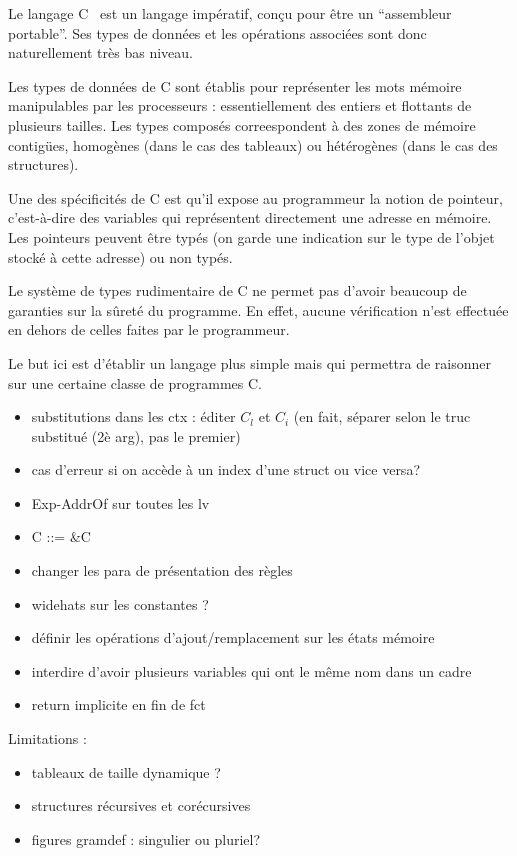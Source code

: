 
Le langage C~\cite{KandR} est un langage impératif, conçu pour être un
``assembleur portable''. Ses types de données et les opérations associées sont
donc naturellement très bas niveau.

Les types de données de C sont établis pour représenter les mots mémoire
manipulables par les processeurs : essentiellement des entiers et flottants de
plusieurs tailles. Les types composés correespondent à des zones de mémoire
contigües, homogènes (dans le cas des tableaux) ou hétérogènes (dans le cas des
structures).

Une des spécificités de C est qu'il expose au programmeur la notion de pointeur,
c'est-à-dire des variables qui représentent directement une adresse en mémoire.
Les pointeurs peuvent être typés (on garde une indication sur le type de l'objet
stocké à cette adresse) ou non typés.

Le système de types rudimentaire de C ne permet pas d'avoir beaucoup de
garanties sur la sûreté du programme. En effet, aucune vérification n'est
effectuée en dehors de celles faites par le programmeur.

Le but ici est d'établir un langage plus simple mais qui permettra de raisonner
sur une certaine classe de programmes C.


\begin{itemize}
\item substitutions dans les ctx : éditer $C_l$ et $C_i$
  (en fait, séparer selon le truc substitué (2è arg), pas le premier)
\item cas d'erreur si on accède à un index d'une struct ou vice versa?
\item Exp-AddrOf sur toutes les lv
\item C ::= \&C
\item changer les para de présentation des règles
\item widehats sur les constantes ?
\item définir les opérations d'ajout/remplacement sur les états mémoire
\item interdire d'avoir plusieurs variables qui ont le même nom dans un cadre
\item return implicite en fin de fct
\end{itemize}

Limitations :

\begin{itemize}
\item tableaux de taille dynamique ?
\item structures récursives et corécursives
\item figures gramdef : singulier ou pluriel?
\end{itemize}


